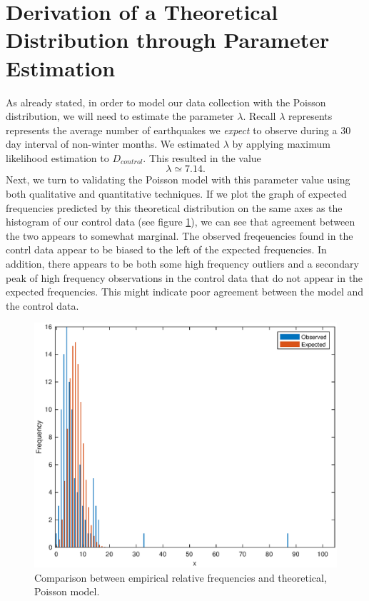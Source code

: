 \documentclass{amsart}
\begin{document}
\section{Derivation of a Theoretical Distribution through Parameter Estimation}
As already stated, in order to model our data collection with the Poisson distribution, we will need to estimate the parameter $\lambda$. Recall $\lambda$ represents represents the average number of earthquakes we \textsl{expect} to observe during a 30 day interval of non-winter months. We estimated $\lambda$ by applying maximum likelihood estimation to $D_{control}$. This resulted in the value
\[
\lambda\simeq 7.14.
\]
Next, we turn to validating the Poisson model with this parameter value using both qualitative and quantitative techniques. If we plot the graph of expected frequencies predicted by this theoretical distribution on the same axes as the histogram of our control data (see figure \ref{F:graphicalAssessement}), we can see that agreement between the two appears to somewhat marginal. The observed freqeuencies found in the contrl data appear to be biased to the left of the expected frequencies. In addition, there appears to be both some high frequency outliers and a secondary peak of high frequency observations in the control data that do not appear in the expected frequencies. This might indicate poor agreement between the model and the control data.
\begin{figure}
\centering
\includegraphics[scale=0.55]{histvalidationfinal}
\caption{
Comparison between empirical relative frequencies and theoretical, Poisson model.\label{F:graphicalAssessement}}
\end{figure}
\end{document}
